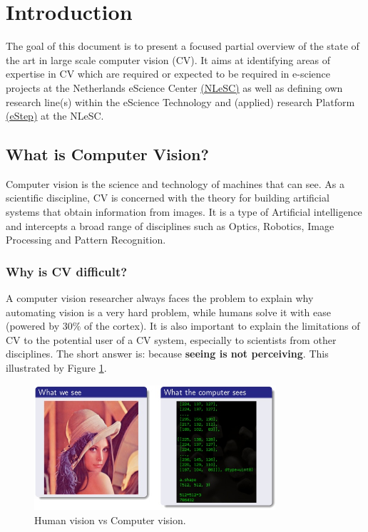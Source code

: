 \section{Introduction}
\label{sec:intro}
  
The goal of this document is to present a focused partial overview of the state of the art in large scale computer vision (CV).  It aims at identifying areas of expertise in CV which are required or expected to be required in e-science projects at the Netherlands eScience Center \href{https://www.esciencecenter.nl/}{\underline{(NLeSC)}} as well as defining own research line(s) within the eScience Technology and (applied) research Platform \href{https://www.esciencecenter.nl/site/project/estep}{(\underline{eStep})} at the NLeSC.

\subsection{What is Computer Vision?}

Computer vision is the science and technology of machines that can see. As a scientific discipline, CV is concerned with the theory for building artificial systems that obtain information from images. It is a type of Artificial intelligence and intercepts a broad range of disciplines such as Optics, Robotics, Image Processing and Pattern Recognition. 

\subsubsection{Why is CV difficult?}
A computer vision researcher always faces the problem to explain why automating vision is a very hard problem, while humans solve it with ease (powered by $30\%$ of the cortex). It is also important to explain the limitations of CV to the potential user of a CV system, especially to scientists from other disciplines. The short answer is: because {\bf seeing is not perceiving}. This illustrated by Figure \ref{fig:CV}.
\begin{figure}[H]
\begin{center}
\includegraphics[width=0.8\textwidth]{fig/ManVsPC}
\end{center}
\caption{Human vision vs Computer vision.}
\label{fig:CV}
\end{figure}

